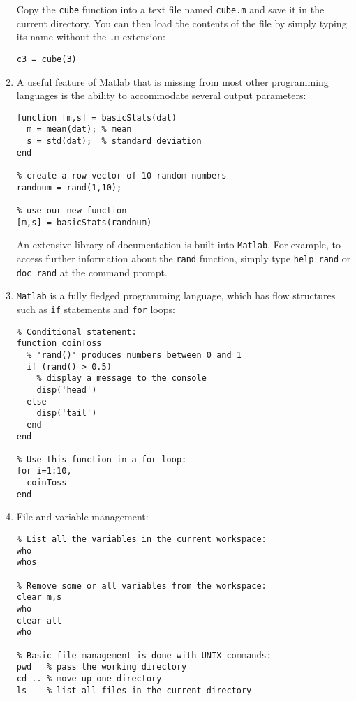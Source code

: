 \begin{enumerate}
Copy the \texttt{cube} function into a text file named \texttt{cube.m}
and save it in the current directory. You can then load the contents
of the file by simply typing its name without the \texttt{.m}
extension:

\begin{verbatim}
c3 = cube(3)
\end{verbatim}

\item A useful feature of Matlab that is missing from most other
  programming languages is the ability to accommodate several output
  parameters:

\begin{verbatim}
function [m,s] = basicStats(dat)
  m = mean(dat); % mean
  s = std(dat);  % standard deviation
end

% create a row vector of 10 random numbers
randnum = rand(1,10);

% use our new function
[m,s] = basicStats(randnum)
\end{verbatim}

An extensive library of documentation is built into \texttt{Matlab}.
For example, to access further information about the \texttt{rand}
function, simply type \texttt{help rand} or \texttt{doc rand} at the
command prompt.

\item\texttt{Matlab} is a fully fledged programming language, which
  has flow structures such as \texttt{if} statements and \texttt{for}
  loops:

\begin{verbatim}
% Conditional statement:
function coinToss
  % 'rand()' produces numbers between 0 and 1
  if (rand() > 0.5)
    % display a message to the console
    disp('head')
  else
    disp('tail')
  end
end

% Use this function in a for loop:
for i=1:10,
  coinToss
end
\end{verbatim}

\item File and variable management:

\begin{verbatim}
% List all the variables in the current workspace:
who
whos

% Remove some or all variables from the workspace:
clear m,s
who
clear all
who

% Basic file management is done with UNIX commands:
pwd   % pass the working directory
cd .. % move up one directory
ls    % list all files in the current directory
\end{verbatim}


\end{enumerate}

